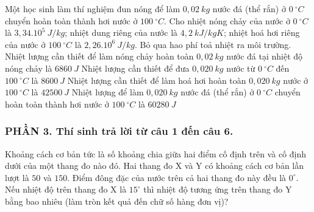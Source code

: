 \begin{ex}
	Một học sinh làm thí nghiệm đun nóng để làm $0,02\ kg$ nước đá (thể rắn) ở $0\ ^{\circ}C$ chuyển hoàn toàn thành hơi nước ở $100\ ^{\circ}C$. Cho nhiệt nóng chảy của nước ở $0\ ^{\circ}C$ là $3,34.10^{5}\ J/kg$; nhiệt dung riêng của nước là $4,2\ kJ/kgK$; nhiệt hoá hơi riêng của nước ở $100\ ^{\circ}C$ là $2,26.10^{6}\ J/kg$. Bỏ qua hao phí toả nhiệt ra môi trường.
	\choiceTFt
	{Nhiệt lượng cần thiết để làm nóng chảy hoàn toàn $0,02\ kg$ nước đá tại nhiệt độ nóng chảy là $6860\ J$}
	{Nhiệt lượng cần thiết để đưa $0,020\ kg$ nước từ $0\ ^{\circ}C$ đến $100\ ^{\circ}C$ là $8600\ J$}
	{Nhiệt lượng cần thiết để làm hoá hơi hoàn toàn $0,020\ kg$ nước ở $100\ ^{\circ}C$ là $42500\ J$}
	{\True Nhiệt lượng để làm $0,020\ kg$ nước đá (thể rắn) ở $0\ ^{\circ}C$ chuyển hoàn toàn thành hơi nước ở $100\ ^{\circ}C$ là $60280\ J$}
\end{ex}
\subsubsection*{PHẦN 3. Thí sinh trả lời từ câu 1 đến câu 6.}
\setcounter{ex}{0}
\begin{ex}%
	Khoảng cách cơ bản tức là số khoảng chia giữa hai điểm cố định trên và cố định dưới của một thang đo nào đó. Hai thang đo X và Y có khoảng cách cơ bản lần lượt là $50$ và $150$. Điểm đông đặc của nước trên cả hai thang đo này đều là $0^\circ$. Nếu nhiệt độ trên thang đo X là $15^\circ$ thì nhiệt độ tương ứng trên thang đo Y bằng bao nhiêu (làm tròn kết quả đến chữ số hàng đơn vị)?
\end{ex}

